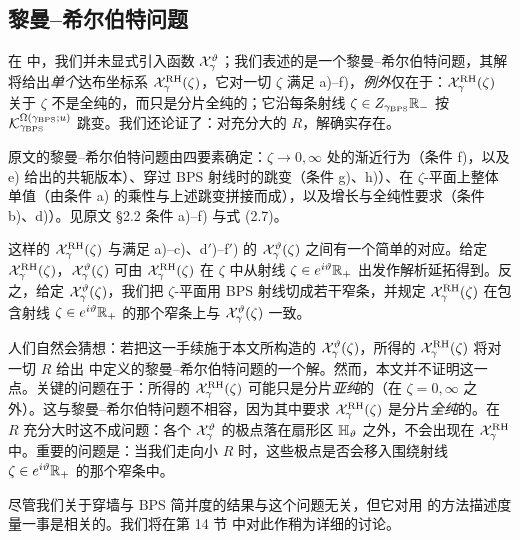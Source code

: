 \subsection{黎曼–希尔伯特问题}
\label{subsec:RH-problem}

在 \cite{Gaiotto:2008cd} 中，我们并未显式引入函数 $\mathcal{X}^\vartheta_\gamma$；我们表述的是一个黎曼–希尔伯特问题，其解将给出\emph{单个}达布坐标系 $\mathcal{X}^{{\rm RH}}_\gamma(\zeta)$，它对一切 $\zeta$ 满足 a)–f)，\emph{例外}仅在于：$\mathcal{X}^{{\rm RH}}_\gamma(\zeta)$ 关于 $\zeta$ 不是全纯的，而只是分片全纯的；它沿每条射线 $\zeta \in Z_{\gamma_{\rm BPS}}\mathbb{R}_-$ 按 $\mathcal{K}_{\gamma_{\rm BPS}}^{\Omega(\gamma_{\rm BPS}; u)}$ 跳变。我们还论证了：对充分大的 $R$，解确实存在。

\begin{yizhu}
原文的黎曼–希尔伯特问题由四要素确定：$\zeta \to 0, \infty$ 处的渐近行为（条件 f)，以及 e) 给出的共轭版本）、穿过 BPS 射线时的跳变（条件 g)、h)）、在 $\zeta$-平面上整体单值（由条件 a) 的乘性与上述跳变拼接而成），以及增长与全纯性要求（条件 b)、d)）。见原文 §2.2 条件 a)–f) 与式 (2.7)。
\end{yizhu}

这样的 $\mathcal{X}^{{\rm RH}}_\gamma(\zeta)$ 与满足 a)–c)、d$'$)–f$'$) 的 $\mathcal{X}_\gamma^{\vartheta}(\zeta)$ 之间有一个简单的对应。给定 $\mathcal{X}^{{\rm RH}}_\gamma(\zeta)$，$\mathcal{X}_\gamma^{\vartheta}(\zeta)$ 可由 $\mathcal{X}^{{\rm RH}}_\gamma(\zeta)$ 在 $\zeta$ 中从射线 $\zeta \in e^{i \vartheta}\mathbb{R}_+$ 出发作解析延拓得到。反之，给定 $\mathcal{X}_\gamma^\vartheta(\zeta)$，我们把 $\zeta$-平面用 BPS 射线切成若干窄条，并规定 $\mathcal{X}^{{\rm RH}}_\gamma(\zeta)$ 在包含射线 $\zeta \in e^{i \vartheta}\mathbb{R}_+$ 的那个窄条上与 $\mathcal{X}_\gamma^\vartheta(\zeta)$ 一致。

人们自然会猜想：若把这一手续施于本文所构造的 $\mathcal{X}^\vartheta_\gamma(\zeta)$，所得的 $\mathcal{X}^{{\rm RH}}_\gamma(\zeta)$ 将对一切 $R$ 给出 \cite{Gaiotto:2008cd} 中定义的黎曼–希尔伯特问题的一个解。然而，本文并不证明这一点。关键的问题在于：所得的 $\mathcal{X}^{{\rm RH}}_\gamma(\zeta)$ 可能只是分片\emph{亚纯}的（在 $\zeta = 0, \infty$ 之外）。这与黎曼–希尔伯特问题不相容，因为其中要求 $\mathcal{X}^{{\rm RH}}_\gamma(\zeta)$ 是分片\emph{全纯}的。在 $R$ 充分大时这不成问题：各个 $\mathcal{X}^\vartheta_\gamma$ 的极点落在扇形区 ${\mathbb{H}}_\vartheta$ 之外，不会出现在 $\mathcal{X}^{{\rm RH}}_\gamma$ 中。重要的问题是：当我们走向小 $R$ 时，这些极点是否会移入围绕射线 $\zeta \in e^{i \vartheta}\mathbb{R}_+$ 的那个窄条中。

尽管我们关于穿墙与 BPS 简并度的结果与这个问题无关，但它对用 \cite{Gaiotto:2008cd} 的方法描述\hk 度量一事是相关的。我们将在第 14 节%
中对此作稍为详细的讨论。
